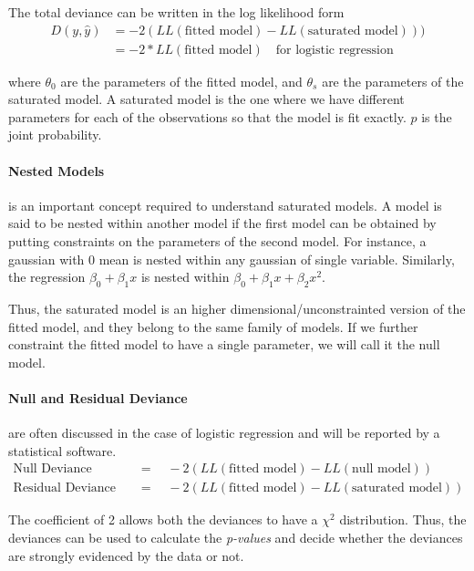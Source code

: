 \documentclass[../statistical_learning_notes.tex]{subfiles}
\begin{document}
    The total deviance can be written in the log likelihood form
    \begin{align*}
        D(y, \hat{y}) &= -2(LL(\text{fitted model}) - LL(\text{saturated model})))\\
                      &= -2*LL(\text{fitted model}) \quad \text{for logistic regression}
    \end{align*}

    where $\theta_{0}$ are the parameters of the fitted model, and $\theta_{s}$ are the parameters of the saturated model. A saturated model is the one where we have different parameters for each of the observations so that the model is fit exactly. $p$ is the joint probability.\newline

    \paragraph{Nested Models} is an important concept required to understand saturated models. A model is said to be nested within another model if the first model can be obtained by putting constraints on the parameters of the second model. For instance, a gaussian with $0$ mean is nested within any gaussian of single variable. Similarly, the regression $\beta_{0} + \beta_{1}x$ is nested within $\beta_{0} + \beta_{1}x + \beta_{2}x^{2}$.\newline

    Thus, the saturated model is an higher dimensional/unconstrainted version of the fitted model, and they belong to the same family of models. If we further constraint the fitted model to have a single parameter, we will call it the null model.\newline

    \paragraph{Null and Residual Deviance} are often discussed in the case of logistic regression and will be reported by a statistical software.
    \begin{align*}
         \text{Null Deviance} \quad &= \quad -2(LL(\text{fitted model}) - LL(\text{null model}))\\
         \text{Residual Deviance} \quad &= \quad -2(LL(\text{fitted model}) - LL(\text{saturated model}))
    \end{align*}

    The coefficient of 2 allows both the deviances to have a $\chi^{2}$ distribution. Thus, the deviances can be used to calculate the \emph{p-values} and decide whether the deviances are strongly evidenced by the data or not.\newline
\end{document}
